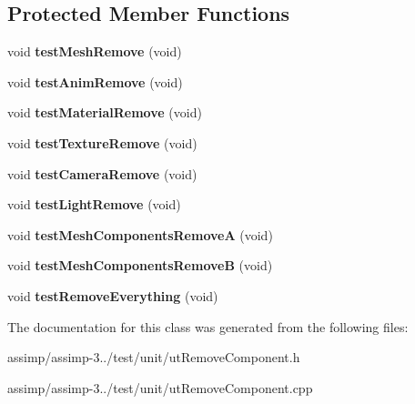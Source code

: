 \subsection*{Protected Member Functions}
\begin{DoxyCompactItemize}
\item 
\hypertarget{class_remove_v_c_process_test_af2d0f3c1361b07e215ebf7c27dfd6684}{void {\bfseries test\+Mesh\+Remove} (void)}\label{class_remove_v_c_process_test_af2d0f3c1361b07e215ebf7c27dfd6684}

\item 
\hypertarget{class_remove_v_c_process_test_a5389545c8bd7c9bc8e506300d3cf1837}{void {\bfseries test\+Anim\+Remove} (void)}\label{class_remove_v_c_process_test_a5389545c8bd7c9bc8e506300d3cf1837}

\item 
\hypertarget{class_remove_v_c_process_test_aed6892932558fd074f66a4b988aab450}{void {\bfseries test\+Material\+Remove} (void)}\label{class_remove_v_c_process_test_aed6892932558fd074f66a4b988aab450}

\item 
\hypertarget{class_remove_v_c_process_test_a1d27a01c5b5393b68ffba4b2b4d5bfa5}{void {\bfseries test\+Texture\+Remove} (void)}\label{class_remove_v_c_process_test_a1d27a01c5b5393b68ffba4b2b4d5bfa5}

\item 
\hypertarget{class_remove_v_c_process_test_ae7c4e3aa4bda74dedf96a90cf2dc0f4b}{void {\bfseries test\+Camera\+Remove} (void)}\label{class_remove_v_c_process_test_ae7c4e3aa4bda74dedf96a90cf2dc0f4b}

\item 
\hypertarget{class_remove_v_c_process_test_a482e4fdcd7e2de7708498b2a05672928}{void {\bfseries test\+Light\+Remove} (void)}\label{class_remove_v_c_process_test_a482e4fdcd7e2de7708498b2a05672928}

\item 
\hypertarget{class_remove_v_c_process_test_a3db4109392a22add886f85aa4815a5df}{void {\bfseries test\+Mesh\+Components\+Remove\+A} (void)}\label{class_remove_v_c_process_test_a3db4109392a22add886f85aa4815a5df}

\item 
\hypertarget{class_remove_v_c_process_test_aa5a0459df93ef67bb849e07fd583bf0d}{void {\bfseries test\+Mesh\+Components\+Remove\+B} (void)}\label{class_remove_v_c_process_test_aa5a0459df93ef67bb849e07fd583bf0d}

\item 
\hypertarget{class_remove_v_c_process_test_ab00ed778aed52cc17acc72b949f86a24}{void {\bfseries test\+Remove\+Everything} (void)}\label{class_remove_v_c_process_test_ab00ed778aed52cc17acc72b949f86a24}

\end{DoxyCompactItemize}


The documentation for this class was generated from the following files\+:\begin{DoxyCompactItemize}
\item 
assimp/assimp-\/3../test/unit/ut\+Remove\+Component.\+h\item 
assimp/assimp-\/3../test/unit/ut\+Remove\+Component.\+cpp\end{DoxyCompactItemize}
